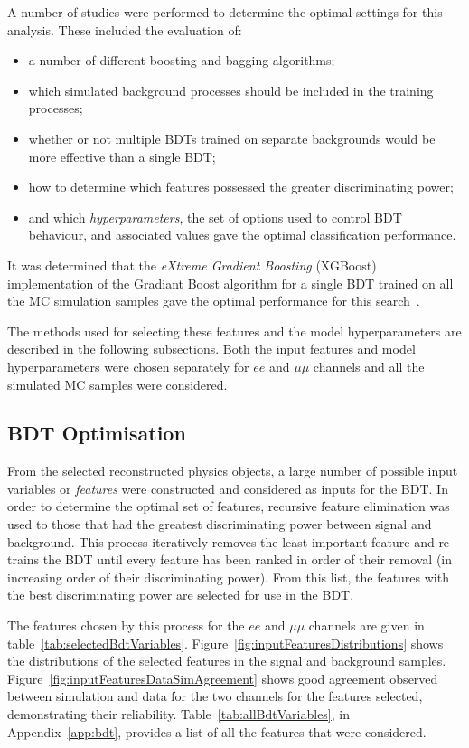 A number of studies were performed to determine the optimal settings for this analysis.
These included the evaluation of:

\begin{itemize}
\item a number of different boosting and bagging algorithms;
\item which simulated background processes should be included in the training processes;
\item whether or not multiple BDTs trained on separate backgrounds would be more effective than a single BDT;
\item how to determine which features possessed the greater discriminating power;
\item and which \emph{hyperparameters}, the set of options used to control BDT behaviour, and associated values gave the optimal classification performance.
\end{itemize}

It was determined that the \emph{eXtreme Gradient Boosting} (XGBoost) implementation of the Gradiant Boost algorithm for a single BDT trained on all the MC simulation samples gave the optimal performance for this search~\cite{xgboost}.

The methods used for selecting these features and the model hyperparameters are described in the following subsections.
Both the input features and model hyperparameters were chosen separately for $ee$ and $\mu\mu$ channels and all the simulated MC samples were considered.

\subsection{BDT Optimisation}
From the selected reconstructed physics objects, a large number of possible input variables or \emph{features} were constructed and considered as inputs for the BDT.
In order to determine the optimal set of features, recursive feature elimination was used to those that had the greatest discriminating power between signal and background.
This process iteratively removes the least important feature and re-trains the BDT until every feature has been ranked in order of their removal (\ie in increasing order of their discriminating power).
From this list, the features with the best discriminating power are selected for use in the BDT.

The features chosen by this process for the $ee$ and $\mu\mu$ channels are given in table~\ref{tab:selectedBdtVariables}.
Figure~\ref{fig:inputFeaturesDistributions} shows the distributions of the selected features in the signal and background samples.
Figure~\ref{fig:inputFeaturesDataSimAgreement} shows good agreement observed between simulation and data for the two channels for the features selected, demonstrating their reliability.
Table~\ref{tab:allBdtVariables}, in Appendix~\ref{app:bdt}, provides a list of all the features that were considered.

